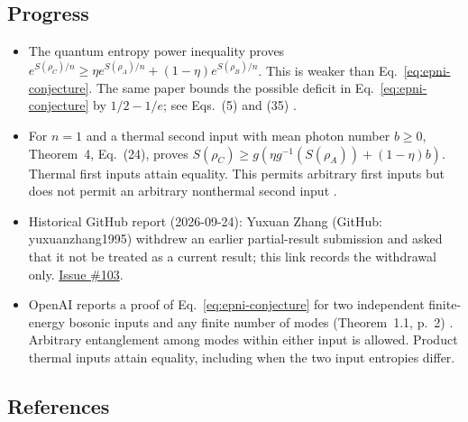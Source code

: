 \subsection*{Progress}

\begin{itemize}
  \item The quantum entropy power inequality proves $e^{S(\rho_C)/n}\geq\eta e^{S(\rho_A)/n}+(1-\eta)e^{S(\rho_B)/n}$. This is weaker than Eq.~\eqref{eq:epni-conjecture}. The same paper bounds the possible deficit in Eq.~\eqref{eq:epni-conjecture} by $1/2-1/e$; see Eqs.~(5) and (35) .

  \item For $n=1$ and a thermal second input with mean photon number $b\geq0$, Theorem~4, Eq.~(24), proves $S(\rho_C)\geq g(\eta g^{-1}(S(\rho_A))+(1-\eta)b)$. Thermal first inputs attain equality. This permits arbitrary first inputs but does not permit an arbitrary nonthermal second input .

  \item Historical GitHub report (2026-09-24): Yuxuan Zhang (GitHub: yuxuanzhang1995) withdrew an earlier partial-result submission and asked that it not be treated as a current result; this link records the withdrawal only. \href{https://github.com/Naixu-Guo/quantum-open-problems/issues/103}{Issue \#103}.

  \item OpenAI reports a proof of Eq.~\eqref{eq:epni-conjecture} for two
  independent finite-energy bosonic inputs and any finite number of modes
  (Theorem~1.1, p.~2) . Arbitrary
  entanglement among modes within either input is allowed. Product thermal
  inputs attain equality, including when the two input entropies differ.
\end{itemize}

\subsection*{References}

